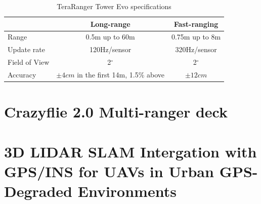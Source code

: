 \begin{table}[ht]
	\footnotesize
	\centering
	\begin{tabular}{ l c c }
		\toprule
		                & Long-range                                & Fast-ranging \\
		\midrule
		Range           & 0.5m up to 60m                            & 0.75m up to 8m \\
		Update rate     & 120Hz/sensor                              & 320Hz/sensor\\
		Field of View   & 2$^{\circ}$                                        & 2$^{\circ}$\\
		Accuracy        & $\pm 4cm$ in the first 14m, 1.5\% above   & $\pm 12cm$\\
		\bottomrule
	\end{tabular}
	\caption{TeraRanger Tower Evo specifications}
	\label{tab:tera_ranger_features}
\end{table}


\section{Crazyflie 2.0 Multi-ranger deck}
\section{3D LIDAR SLAM Intergation with GPS/INS for UAVs in Urban GPS-Degraded Environments}
